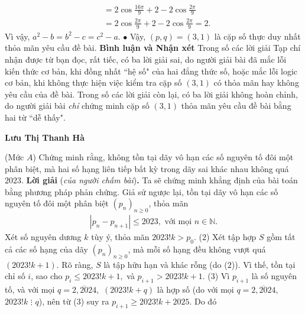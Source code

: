 \begin{multicols}{2}
\begin{align*}
		&= 2\cos \frac{{16\pi }}{9} + 2 - 2\cos \frac{{2\pi }}{9} \\
		&= 2\cos \frac{{2\pi }}{9} + 2 - 2\cos \frac{{2\pi }}{9} = 2.
	\end{align*}
	Vì vậy, ${a^2} - b = {b^2} - c = {c^2} - a$.
	\vskip 0.05cm
	$\bullet$ Vậy, $(p, q) = (3, 1)$ là cặp số thực duy nhất thỏa mãn yêu cầu đề bài.
	\vskip 0.05cm
	\columnbreak
	\textbf{\color{thachthuctoanhoc}Bình luận và Nhận xét}
	\vskip 0.05cm
	Trong số các lời giải Tạp chí nhận được từ bạn đọc, rất tiếc, có ba lời giải sai, do người giải bài đã mắc lỗi kiến thức cơ bản, khi đồng nhất ``hệ số" của hai đẳng thức số, hoặc mắc lỗi logic cơ bản, khi không thực hiện việc kiểm tra cặp số $(3, 1)$ có thỏa mãn hay không yêu cầu của đề bài. Trong số các lời giải còn lại, có ba lời giải không hoàn chỉnh, do người giải bài \textit{chỉ} chứng minh cặp số $(3, 1)$ thỏa mãn yêu cầu đề bài bằng hai từ ``dễ thấy".
	\begin{flushright}
		\textbf{\color{thachthuctoanhoc}Lưu Thị Thanh Hà}
	\end{flushright}
	{}
	(Mức $A$) Chứng minh rằng, không tồn tại dãy vô hạn các số nguyên tố đôi một phân biệt, mà hai số hạng liên tiếp bất kỳ trong dãy sai khác nhau không quá $2023$. 
	\vskip 0.05cm
	\textbf{\color{thachthuctoanhoc}Lời giải} (\textit{của người chấm bài})\textbf{\color{thachthuctoanhoc}.}
	\vskip 0.05cm
	Ta sẽ chứng minh khẳng định của bài toán bằng phương pháp phản chứng.
	\vskip 0.05cm
	Giả sử ngược lại, tồn tại dãy vô hạn các số nguyên tố đôi một phân biệt ${\left( {{p_n}} \right)_{n \ge 0}}$, thỏa mãn
	\begin{align*}
		\left| {{p_n} - {p_{n + 1}}} \right| \le 2023, \text{ với mọi } n \in \mathbb{N}. \tag{$1$}
	\end{align*}
	Xét số nguyên dương $k$ tùy ý, thỏa mãn $2023!k > {p_0}.$ \hfill ($2$)
	\vskip 0.05cm
	Xét tập hợp $S$ gồm tất cả các số hạng của dãy ${\left( {{p_n}} \right)_{n \ge 0}}$, mà mỗi số hạng đều không vượt quá $(2023!k + 1)$.
	\vskip 0.05cm
	Rõ ràng, $S$ là tập hữu hạn và khác rỗng (do ($2$)). Vì thế, tồn tại chỉ số $i$, sao cho  \linebreak ${p_i} \le 2023!k + 1,$ và ${p_{i + 1}} > 2023!k + 1.$ \hfill ($3$)
	\vskip 0.05cm
	Vì  ${p_{i + 1}}$ là số nguyên tố, và với mọi $q = \overline {2,2024} ,$  $(2023!k + q)$ là hợp số (do với mọi $q = \overline {2,2024} ,$  $2023!k \,\,\vdots \,\,q$), nên từ ($3$) suy ra ${p_{i + 1}} \ge 2023!k + 2025.$  Do đó
	\begin{align*}

\end{align*}
\end{multicols}

